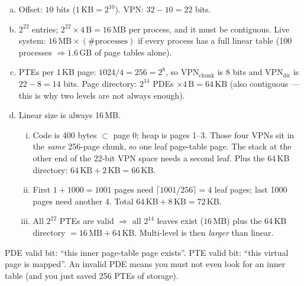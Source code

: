 \documentclass[11pt,a4paper]{article}
\newenvironment{Sol}{%
  \begin{tcolorbox}[sboxstyle, title={Solution}]%
}{%
  \end{tcolorbox}\vspace{0.35em}%
}
\begin{document}
\begin{Sol}
\begin{enumerate}[(a)]
\item Offset: $10$ bits ($1\,\mathrm{KB}=2^{10}$). VPN: $32-10=22$ bits.
\item $2^{22}$ entries; $2^{22}\times 4\,\mathrm{B} = 16\,\mathrm{MB}$
      per process, and it must be contiguous. Live system: $16\,\mathrm{MB}
      \times(\#\textrm{processes})$ if every process has a full linear
      table (100 processes $\Rightarrow 1.6\,\mathrm{GB}$ of page tables
      alone).
\item PTEs per 1\,KB page: $1024/4 = 256 = 2^8$, so
      $\mathrm{VPN}_{\mathrm{chunk}}$ is 8 bits and
      $\mathrm{VPN}_{\mathrm{dir}}$ is $22-8=14$ bits. Page directory:
      $2^{14}$ PDEs $\times 4\,\mathrm{B} = 64\,\mathrm{KB}$ (also
      contiguous --- this is why two levels are not always enough).
\item Linear size is always 16\,MB.
      \begin{enumerate}[(i)]
      \item Code is 400 bytes $\subset$ page 0; heap is pages 1--3.
            Those four VPNs sit in the \emph{same} 256-page chunk, so
            one leaf page-table page. The stack at the other end of the
            22-bit VPN space needs a second leaf. Plus the 64\,KB
            directory: $64\,\mathrm{KB}+2\,\mathrm{KB}=66\,\mathrm{KB}$.
      \item First $1+1000=1001$ pages need
            $\lceil 1001/256\rceil = 4$ leaf pages; last 1000 pages
            need another 4. Total $64\,\mathrm{KB}+8\,\mathrm{KB}=72\,\mathrm{KB}$.
      \item All $2^{22}$ PTEs are valid $\Rightarrow$ all
            $2^{14}$ leaves exist ($16\,\mathrm{MB}$) plus the 64\,KB
            directory $= 16\,\mathrm{MB}+64\,\mathrm{KB}$. Multi-level
            is then \emph{larger} than linear.
      \end{enumerate}
\end{enumerate}
PDE valid bit: ``this inner page-table page exists''. PTE valid bit:
``this virtual page is mapped''. An invalid PDE means you must not even
look for an inner table (and you just saved 256 PTEs of storage).
\end{Sol}
\end{document}
